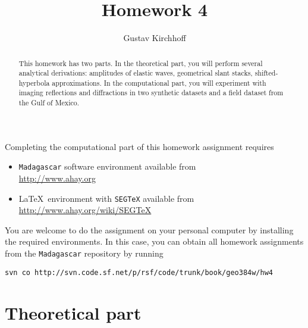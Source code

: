 \author{Gustav Kirchhoff} 
\title{Homework 4}

\begin{abstract}
  This homework has two parts. In the theoretical part, you will
  perform several analytical derivations: amplitudes of elastic waves,
  geometrical slant stacks, shifted-hyperbola approximations. In the
  computational part, you will experiment with imaging reflections and
  diffractions in two synthetic datasets and a field dataset from the
  Gulf of Mexico.
\end{abstract}

Completing the computational part of this homework assignment requires
\begin{itemize}
\item \texttt{Madagascar} software environment available from \\
  \url{http://www.ahay.org}
\item \LaTeX\ environment with \texttt{SEGTeX} available from \\ 
  \url{http://www.ahay.org/wiki/SEGTeX}
\end{itemize}

You are welcome to do the assignment on your personal computer by
installing the required environments. In this case, you can obtain all
homework assignments from the \texttt{Madagascar} repository by running
\begin{verbatim}
svn co http://svn.code.sf.net/p/rsf/code/trunk/book/geo384w/hw4
\end{verbatim}

\section{Theoretical part}

